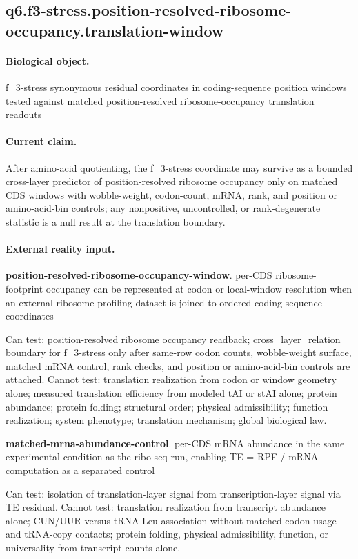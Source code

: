 \subsection{q6.f3-stress.position-resolved-ribosome-occupancy.translation-window}

\paragraph{Biological object.} f\_3-stress synonymous residual coordinates in coding-sequence position windows tested against matched position-resolved ribosome-occupancy translation readouts

\paragraph{Current claim.} After amino-acid quotienting, the f\_3-stress coordinate may survive as a bounded cross-layer predictor of position-resolved ribosome occupancy only on matched CDS windows with wobble-weight, codon-count, mRNA, rank, and position or amino-acid-bin controls; any nonpositive, uncontrolled, or rank-degenerate statistic is a null result at the translation boundary.

\paragraph{External reality input.}
\textbf{position-resolved-ribosome-occupancy-window}. per-CDS ribosome-footprint occupancy can be represented at codon or local-window resolution when an external ribosome-profiling dataset is joined to ordered coding-sequence coordinates

Can test: position-resolved ribosome occupancy readback; cross\_layer\_relation boundary for f\_3-stress only after same-row codon counts, wobble-weight surface, matched mRNA control, rank checks, and position or amino-acid-bin controls are attached. Cannot test: translation realization from codon or window geometry alone; measured translation efficiency from modeled tAI or stAI alone; protein abundance; protein folding; structural order; physical admissibility; function realization; system phenotype; translation mechanism; global biological law.

\textbf{matched-mrna-abundance-control}. per-CDS mRNA abundance in the same experimental condition as the ribo-seq run, enabling TE = RPF / mRNA computation as a separated control

Can test: isolation of translation-layer signal from transcription-layer signal via TE residual. Cannot test: translation realization from transcript abundance alone; CUN/UUR versus tRNA-Leu association without matched codon-usage and tRNA-copy contacts; protein folding, physical admissibility, function, or universality from transcript counts alone.

